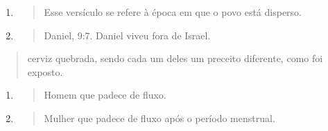 \begin{enumerate}
\def\labelenumi{\arabic{enumi}.}
\setcounter{enumi}{95}
\item
 \begin{quote}
 Esse versículo se refere à época em que o povo está disperso.
 \end{quote}
\item
 \begin{quote}
 Daniel, 9:7. Daniel viveu fora de Israel.
 \end{quote}
\end{enumerate}

\begin{quote}
cerviz quebrada, sendo cada um deles um preceito diferente, como foi
exposto.
\end{quote}

\begin{enumerate}
\def\labelenumi{\arabic{enumi}.}
\setcounter{enumi}{97}
\item
 \begin{quote}
 Homem que padece de fluxo.
 \end{quote}
\item
 \begin{quote}
 Mulher que padece de fluxo após o período menstrual.
 \end{quote}
\end{enumerate}

